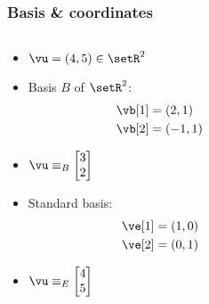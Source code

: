\begin{frame}
  \frametitle{Basis \& coordinates}

  \begin{columns}[T]
    \begin{column}{35mm}
      \begin{itemize}
      \item<1-> $\vu = (4,5)\in \setR^2$
      \item<1-> Basis $B$ of $\setR^2$:
        \ungap[.5]
        \begin{align*}
          \vb[1] &= (2, 1)\\
          \vb[2] &= (-1, 1)
        \end{align*}
        \ungap[2]
      \item<1-> $\vu \equiv_B
        \begin{bmatrix}
          3\\ 2
        \end{bmatrix}$
      \item<2-> Standard basis:
        \ungap[.5]
        \begin{align*}
          \ve[1] &= (1, 0)\\
          \ve[2] &= (0, 1)
        \end{align*}       
        \ungap[2]
      \item<2-> $\vu \equiv_E
        \begin{bmatrix}
          4\\ 5
        \end{bmatrix}$
      \end{itemize}
    \end{column}
    \begin{column}{65mm}
      \gap[2]
    \end{column}
  \end{columns}
\end{frame}

